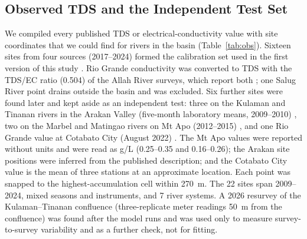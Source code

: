 \documentclass[10pt,twocolumn,letterpaper]{article}
\begin{document}
\subsection{Observed TDS and the Independent Test Set}
We compiled every published TDS or electrical-conductivity value with site coordinates that we could find for rivers in the basin (Table~\ref{tab:obs}). Sixteen sites from four sources (2017--2024) formed the calibration set used in the first version of this study \cite{brillantes,dimalen,dumago,galarpe}. Rio Grande conductivity \cite{dimalen} was converted to TDS with the TDS/EC ratio (0.504) of the Allah River surveys, which report both \cite{brillantes}; one Salug River point drains outside the basin and was excluded. Six further sites were found later and kept aside as an independent test: three on the Kulaman and Tinanan rivers in the Arakan Valley (five-month laboratory means, 2009--2010) \cite{villabeto}, two on the Marbel and Matingao rivers on Mt Apo (2012--2015) \cite{quimpang}, and one Rio Grande value at Cotabato City (August 2022) \cite{alombro}. The Mt Apo values were reported without units and were read as g/L (0.25--0.35 and 0.16--0.26); the Arakan site positions were inferred from the published description; and the Cotabato City value is the mean of three stations at an approximate location. Each point was snapped to the highest-accumulation cell within 270~m. The 22 sites span 2009--2024, mixed seasons and instruments, and 7 river systems. A 2026 resurvey of the Kulaman--Tinanan confluence (three-replicate meter readings 50~m from the confluence) \cite{wong} was found after the model runs and was used only to measure survey-to-survey variability and as a further check, not for fitting.
\end{document}
